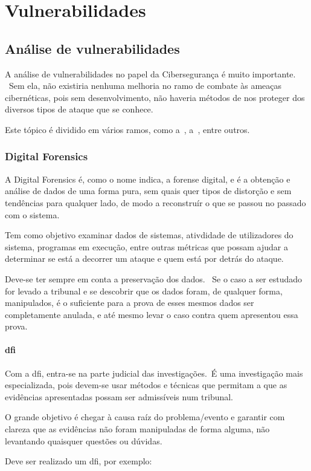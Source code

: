 \documentclass{report}
\begin{document}
\chapter{Vulnerabilidades}
\label{ch:vulnerabilidades}
\section{Análise de vulnerabilidades}
\label{sec:analise-de-vulnerabilidades}
A análise de vulnerabilidades no papel da Cibersegurança é muito importante. \ Sem ela, não existiria nenhuma melhoria no ramo de combate às ameaças cibernéticas, pois sem desenvolvimento, não haveria métodos de nos proteger dos diversos tipos de ataque que se conhece. \par
Este tópico é dividido em vários ramos, como a~\textbf{}, a~\textbf{}, entre outros.

\subsection{Digital Forensics}
\label{subsec:digital-forensics}
A Digital Forensics é, como o nome indica, a forense digital, e é a obtenção e análise de dados de uma forma pura, sem quais quer tipos de distorção e sem tendências para qualquer lado, de modo a reconstruír o que se passou no passado com o sistema. \par
Tem como objetivo examinar dados de sistemas, ativdidade de utilizadores do sistema, programas em execução, entre outras métricas que possam ajudar a determinar se está a decorrer um ataque e quem está por detrás do ataque. \par
Deve-se ter sempre em conta a preservação dos dados. \ Se o caso a ser estudado for levado a tribunal e se descobrir que os dados foram, de qualquer forma, manipulados, é o suficiente para a prova de esses mesmos dados ser completamente anulada, e até mesmo levar o caso contra quem apresentou essa prova.

\newpage

\subsubsection{\ac{dfi}}
Com a \ac{dfi}, entra-se na parte judicial das investigações.\ É uma investigação mais especializada, pois devem-se usar métodos e técnicas que permitam a que as evidências apresentadas possam ser admissíveis num tribunal.\par
O grande objetivo é chegar à causa raíz do problema/evento e garantir com clareza que as evidências não foram manipuladas de forma alguma, não levantando quaisquer questões ou dúvidas.\par
Deve ser realizado um \ac{dfi}, por exemplo:
\end{document}
